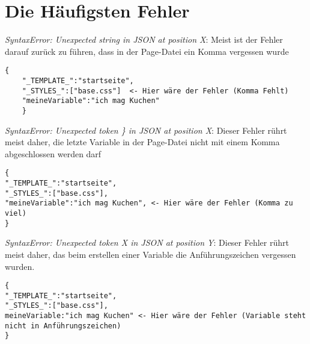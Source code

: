\documentclass[ngerman,a4paper]{scrartcl}
\begin{document}
\section{Die Häufigsten Fehler}
\textit{SyntaxError: Unexpected string in JSON at position X}: 
\newline
Meist ist der Fehler darauf zurück zu führen, dass in der Page-Datei 
ein Komma vergessen wurde
\begin{lstlisting}[style=JSSTE]
	{
	"_TEMPLATE_":"startseite",
	"_STYLES_":["base.css"]  <- Hier wäre der Fehler (Komma Fehlt)
	"meineVariable":"ich mag Kuchen"
	}
\end{lstlisting}

\textit{SyntaxError: Unexpected token \} in JSON at position X}: 
\newline
Dieser Fehler rührt meist daher, die letzte Variable in der Page-Datei nicht mit einem Komma abgeschlossen werden darf
\begin{lstlisting}[style=JSSTE]
{
"_TEMPLATE_":"startseite",
"_STYLES_":["base.css"],  
"meineVariable":"ich mag Kuchen", <- Hier wäre der Fehler (Komma zu viel)
}
\end{lstlisting}

\textit{SyntaxError: Unexpected token X in JSON at position Y}: 
\newline
Dieser Fehler rührt meist daher, das beim erstellen einer Variable die Anführungszeichen vergessen wurden.
\begin{lstlisting}[style=JSSTE]
{
"_TEMPLATE_":"startseite",
"_STYLES_":["base.css"],  
meineVariable:"ich mag Kuchen" <- Hier wäre der Fehler (Variable steht nicht in Anführungszeichen)
}
\end{lstlisting}







	
\end{document}
